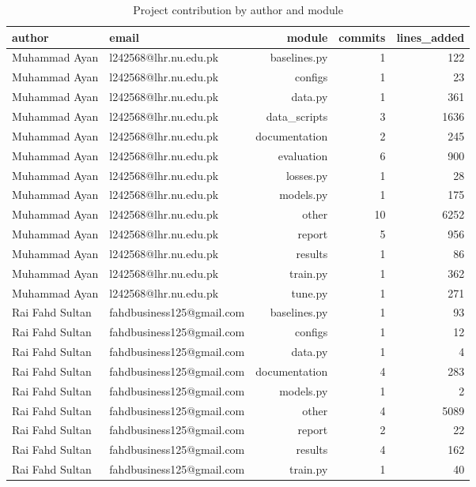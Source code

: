 \begin{table}[htbp]
\centering
\caption{Project contribution by author and module}
\label{tab:contributions}
\begin{tabular}{llrrr}
\toprule
author & email & module & commits & lines\_added \\
\midrule
Muhammad Ayan & l242568@lhr.nu.edu.pk & baselines.py & 1 & 122 \\
Muhammad Ayan & l242568@lhr.nu.edu.pk & configs & 1 & 23 \\
Muhammad Ayan & l242568@lhr.nu.edu.pk & data.py & 1 & 361 \\
Muhammad Ayan & l242568@lhr.nu.edu.pk & data\_scripts & 3 & 1636 \\
Muhammad Ayan & l242568@lhr.nu.edu.pk & documentation & 2 & 245 \\
Muhammad Ayan & l242568@lhr.nu.edu.pk & evaluation & 6 & 900 \\
Muhammad Ayan & l242568@lhr.nu.edu.pk & losses.py & 1 & 28 \\
Muhammad Ayan & l242568@lhr.nu.edu.pk & models.py & 1 & 175 \\
Muhammad Ayan & l242568@lhr.nu.edu.pk & other & 10 & 6252 \\
Muhammad Ayan & l242568@lhr.nu.edu.pk & report & 5 & 956 \\
Muhammad Ayan & l242568@lhr.nu.edu.pk & results & 1 & 86 \\
Muhammad Ayan & l242568@lhr.nu.edu.pk & train.py & 1 & 362 \\
Muhammad Ayan & l242568@lhr.nu.edu.pk & tune.py & 1 & 271 \\
Rai Fahd Sultan & fahdbusiness125@gmail.com & baselines.py & 1 & 93 \\
Rai Fahd Sultan & fahdbusiness125@gmail.com & configs & 1 & 12 \\
Rai Fahd Sultan & fahdbusiness125@gmail.com & data.py & 1 & 4 \\
Rai Fahd Sultan & fahdbusiness125@gmail.com & documentation & 4 & 283 \\
Rai Fahd Sultan & fahdbusiness125@gmail.com & models.py & 1 & 2 \\
Rai Fahd Sultan & fahdbusiness125@gmail.com & other & 4 & 5089 \\
Rai Fahd Sultan & fahdbusiness125@gmail.com & report & 2 & 22 \\
Rai Fahd Sultan & fahdbusiness125@gmail.com & results & 4 & 162 \\
Rai Fahd Sultan & fahdbusiness125@gmail.com & train.py & 1 & 40 \\

\end{tabular}
\end{table}
